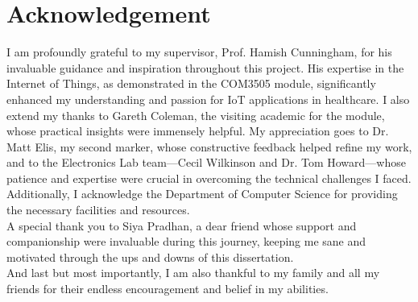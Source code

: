 \chapter*{\Large \center Acknowledgement}

I am profoundly grateful to my supervisor, Prof. Hamish Cunningham, for his invaluable guidance and inspiration throughout this project. His expertise in the Internet of Things, as demonstrated in the COM3505 module, significantly enhanced my understanding and passion for IoT applications in healthcare. I also extend my thanks to Gareth Coleman, the visiting academic for the module, whose practical insights were immensely helpful. My appreciation goes to Dr. Matt Elis, my second marker, whose constructive feedback helped refine my work, and to the Electronics Lab team—Cecil Wilkinson and Dr. Tom Howard—whose patience and expertise were crucial in overcoming the technical challenges I faced. Additionally, I acknowledge the Department of Computer Science for providing the necessary facilities and resources. \\

\noindent A special thank you to Siya Pradhan, a dear friend whose support and companionship were invaluable during this journey, keeping me sane and motivated through the ups and downs of this dissertation. \\

\noindent And last but most importantly, I am also thankful to my family and all my friends for their endless encouragement and belief in my abilities. 